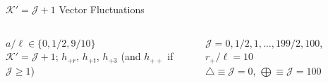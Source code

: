 \documentclass[xcolor=dvipsnames]{beamer}
\begin{document}
\begin{frame}{\(\mathcal K' = \mathcal J + 1\) Vector Fluctuations}
  \vfill

  \begin{columns}[c]
    \begin{column}{0.5\textwidth}
      \(a/\ell \in \{0, 1/2, 9/10\}\)\\
      \(\mathcal K' = \mathcal J + 1\); \(h_{+r}\), \(h_{+t}\), \(h_{+3}\) 
      (and \(h_{++}\) if \(\mathcal J \geq 1\))
    \end{column}

    \begin{column}{0.5\textwidth}
      \(\mathcal J = 0, 1/2, 1, \ldots, 199/2, 100\), \(r_+/\ell = 10\)\\
      \(\bigtriangleup \equiv \mathcal J = 0\),
      \(\bigoplus \equiv \mathcal J = 100\)
    \end{column}
  \end{columns}
\end{frame}
\end{document}

